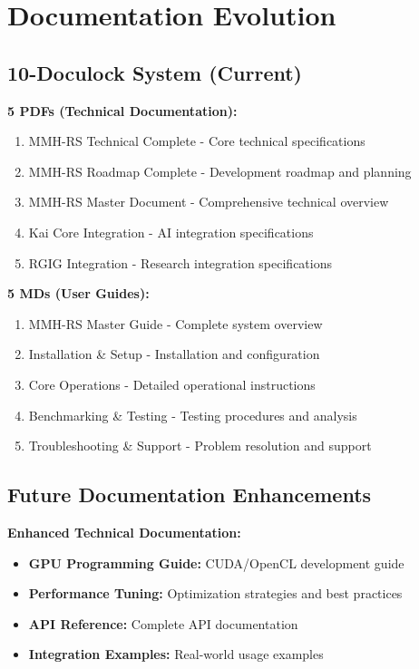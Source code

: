 \documentclass[12pt,a4paper]{article}
\begin{document}
\section{Documentation Evolution}

\subsection{10-Doculock System (Current)}

\textbf{5 PDFs (Technical Documentation):}
\begin{enumerate}
    \item MMH-RS Technical Complete - Core technical specifications
    \item MMH-RS Roadmap Complete - Development roadmap and planning
    \item MMH-RS Master Document - Comprehensive technical overview
    \item Kai Core Integration - AI integration specifications
    \item RGIG Integration - Research integration specifications
\end{enumerate}

\textbf{5 MDs (User Guides):}
\begin{enumerate}
    \item MMH-RS Master Guide - Complete system overview
    \item Installation \& Setup - Installation and configuration
    \item Core Operations - Detailed operational instructions
    \item Benchmarking \& Testing - Testing procedures and analysis
    \item Troubleshooting \& Support - Problem resolution and support
\end{enumerate}

\subsection{Future Documentation Enhancements}

\textbf{Enhanced Technical Documentation:}
\begin{itemize}
    \item \textbf{GPU Programming Guide:} CUDA/OpenCL development guide
    \item \textbf{Performance Tuning:} Optimization strategies and best practices
    \item \textbf{API Reference:} Complete API documentation
    \item \textbf{Integration Examples:} Real-world usage examples
\end{itemize}
\end{document}
